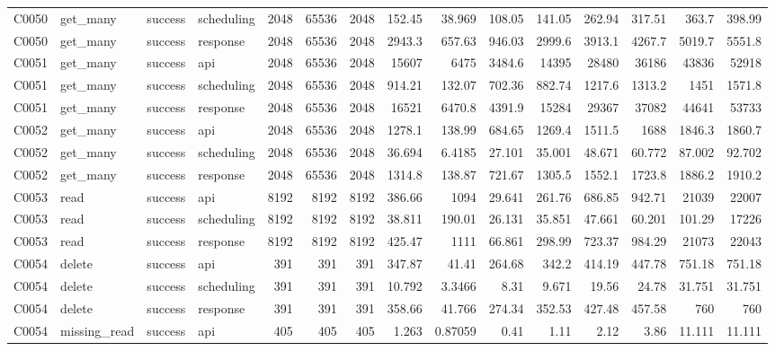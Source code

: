 \begin{landscape}
\begin{longtable}{llllrrrrrrrrrrr}
C0050 & get\_\allowbreak{}many & success & scheduling & 2048 & 65536 & 2048 & 152.45 & 38.969 & 108.05 & 141.05 & 262.94 & 317.51 & 363.7 & 398.99\\
C0050 & get\_\allowbreak{}many & success & response & 2048 & 65536 & 2048 & 2943.3 & 657.63 & 946.03 & 2999.6 & 3913.1 & 4267.7 & 5019.7 & 5551.8\\
C0051 & get\_\allowbreak{}many & success & api & 2048 & 65536 & 2048 & 15607 & 6475 & 3484.6 & 14395 & 28480 & 36186 & 43836 & 52918\\
C0051 & get\_\allowbreak{}many & success & scheduling & 2048 & 65536 & 2048 & 914.21 & 132.07 & 702.36 & 882.74 & 1217.6 & 1313.2 & 1451 & 1571.8\\
C0051 & get\_\allowbreak{}many & success & response & 2048 & 65536 & 2048 & 16521 & 6470.8 & 4391.9 & 15284 & 29367 & 37082 & 44641 & 53733\\
C0052 & get\_\allowbreak{}many & success & api & 2048 & 65536 & 2048 & 1278.1 & 138.99 & 684.65 & 1269.4 & 1511.5 & 1688 & 1846.3 & 1860.7\\
C0052 & get\_\allowbreak{}many & success & scheduling & 2048 & 65536 & 2048 & 36.694 & 6.4185 & 27.101 & 35.001 & 48.671 & 60.772 & 87.002 & 92.702\\
C0052 & get\_\allowbreak{}many & success & response & 2048 & 65536 & 2048 & 1314.8 & 138.87 & 721.67 & 1305.5 & 1552.1 & 1723.8 & 1886.2 & 1910.2\\
C0053 & read & success & api & 8192 & 8192 & 8192 & 386.66 & 1094 & 29.641 & 261.76 & 686.85 & 942.71 & 21039 & 22007\\
C0053 & read & success & scheduling & 8192 & 8192 & 8192 & 38.811 & 190.01 & 26.131 & 35.851 & 47.661 & 60.201 & 101.29 & 17226\\
C0053 & read & success & response & 8192 & 8192 & 8192 & 425.47 & 1111 & 66.861 & 298.99 & 723.37 & 984.29 & 21073 & 22043\\
C0054 & delete & success & api & 391 & 391 & 391 & 347.87 & 41.41 & 264.68 & 342.2 & 414.19 & 447.78 & 751.18 & 751.18\\
C0054 & delete & success & scheduling & 391 & 391 & 391 & 10.792 & 3.3466 & 8.31 & 9.671 & 19.56 & 24.78 & 31.751 & 31.751\\
C0054 & delete & success & response & 391 & 391 & 391 & 358.66 & 41.766 & 274.34 & 352.53 & 427.48 & 457.58 & 760 & 760\\
C0054 & missing\_\allowbreak{}read & success & api & 405 & 405 & 405 & 1.263 & 0.87059 & 0.41 & 1.11 & 2.12 & 3.86 & 11.111 & 11.111\\

\end{longtable}
\end{landscape}

